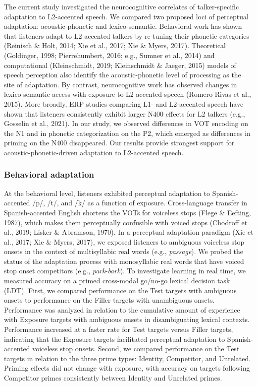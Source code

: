 \documentclass[
  12pt,
  twoside]{article}
\begin{document}
The current study investigated the neurocognitive correlates of talker-specific adaptation to L2-accented speech.
We compared two proposed loci of perceptual adaptation: acoustic-phonetic and lexico-semantic.
Behavioral work has shown that listeners adapt to L2-accented talkers by re-tuning their phonetic categories (Reinisch \& Holt, 2014; Xie et al., 2017; Xie \& Myers, 2017).
Theoretical (Goldinger, 1998; Pierrehumbert, 2016; e.g., Sumner et al., 2014) and computational (Kleinschmidt, 2019; Kleinschmidt \& Jaeger, 2015) models of speech perception also identify the acoustic-phonetic level of processing as the site of adaptation.
By contrast, neurocognitive work has observed changes in lexico-semantic access with exposure to L2-accented speech (Romero-Rivas et al., 2015).
More broadly, ERP studies comparing L1- and L2-accented speech have shown that listeners consistently exhibit larger N400 effects for L2 talkers (e.g., Gosselin et al., 2021).
In our study, we observed differences in VOT encoding on the N1 and in phonetic categorization on the P2, which emerged as differences in priming on the N400 disappeared.
Our results provide strongest support for acoustic-phonetic-driven adaptation to L2-accented speech.

\hypertarget{behavioral-adaptation}{%
\subsubsection{Behavioral adaptation}\label{behavioral-adaptation}}

At the behavioral level, listeners exhibited perceptual adaptation to Spanish-accented /p/, /t/, and /k/ as a function of exposure.
Cross-language transfer in Spanish-accented English shortens the VOTs for voiceless stops (Flege \& Eefting, 1987), which makes them perceptually confusible with voiced stops (Chodroff et al., 2019; Lisker \& Abramson, 1970).
In a perceptual adaptation paradigm (Xie et al., 2017; Xie \& Myers, 2017), we exposed listeners to ambiguous voiceless stop onsets in the context of multisyllabic real words (e.g., \emph{passage}).
We probed the status of the adaptation process with monosyllabic real words that have voiced stop onset competitors (e.g., \emph{park}-\emph{bark}).
To investigate learning in real time, we measured accuracy on a primed cross-modal go/no-go lexical decision task (LDT).
First, we compared performance on the Test targets with ambiguous onsets to performance on the Filler targets with unambiguous onsets.
Performance was analyzed in relation to the cumulative amount of experience with Exposure targets with ambiguous onsets in disambiguating lexical contexts.
Performance increased at a faster rate for Test targets versus Filler targets, indicating that the Exposure targets facilitated perceptual adaptation to Spanish-accented voiceless stop onsets.
Second, we compared performance on the Test targets in relation to the three prime types: Identity, Competitor, and Unrelated.
Priming effects did not change with exposure, with accuracy on targets following Competitor primes consistently between Identity and Unrelated primes.
\end{document}
